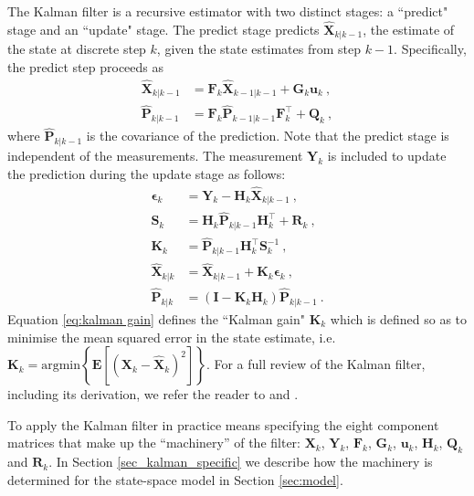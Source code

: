 \documentclass[fleqn,usenatbib,useAMS]{mnras}
\begin{document}
The Kalman filter is a recursive estimator with two distinct stages: a ``predict" stage and an ``update" stage. The predict stage predicts $\hat{\boldsymbol{X}}_{k|k-1}$, the estimate of the state at discrete step $k$, given the state estimates from step $k-1$. Specifically, the predict step proceeds as
\begin{align}
	\hat{\boldsymbol{X}}_{k|k-1} &=  \boldsymbol{F}_k \hat{\boldsymbol{X}}_{k-1|k-1} + \boldsymbol{G}_k \boldsymbol{u}_k \ , \\
		\hat{\boldsymbol{P}}_{k|k-1} &=  \boldsymbol{F}_k \hat{\boldsymbol{P}}_{k-1|k-1} \boldsymbol{F}_k^\intercal + \boldsymbol{Q}_k  \ ,
\end{align}
where $\hat{\boldsymbol{P}}_{k|k-1}$ is the covariance of the prediction. Note that the predict stage is independent of the measurements. The measurement $\boldsymbol{Y}_k$ is included to update the prediction during the update stage as follows:
\begin{align}
	\boldsymbol{\epsilon}_{k} &= \boldsymbol{Y}_k - \boldsymbol{H}_k \hat{\boldsymbol{X}}_{k|k-1} \ , \\
	\boldsymbol{S}_k &= \boldsymbol{H}_k \hat{\boldsymbol{P}}_{k|k-1} \boldsymbol{H}_k^\intercal + \boldsymbol{R}_k \ , \\
	\boldsymbol{K}_k &= \hat{\boldsymbol{P}}_{k|k-1} \boldsymbol{H}_k^\intercal \boldsymbol{S}_k^{-1} \ ,\label{eq:kalman gain} \\
		\hat{\boldsymbol{X}}_{k|k} &=\hat{\boldsymbol{X}}_{k|k-1} +\boldsymbol{K}_k  \boldsymbol{\epsilon}_{k}  \ , \label{eq:kalmangainupdate} \\
			\hat{\boldsymbol{P}}_{k|k} &= \left( \boldsymbol{I} - \boldsymbol{K}_k \boldsymbol{H}_k \right) 	\hat{\boldsymbol{P}}_{k|k-1} \ .
\end{align}
Equation \eqref{eq:kalman gain} defines the ``Kalman gain" $\boldsymbol{K}_k$ which is defined so as to minimise the mean squared error in the state estimate, i.e.  $\boldsymbol{K}_k = \text{argmin} \left \{ \boldsymbol{E}[ (\boldsymbol{X}_k - \hat{\boldsymbol{X}}_k)^2 ] \right \}$. For a full review of the Kalman filter, including its derivation, we refer the reader to \cite{Gelb:1974} and \cite{zarchan2000fundamentals}. \newline 

To apply the Kalman filter in practice means specifying the eight component matrices that make up the ``machinery'' of the filter: $\boldsymbol{X}_k$, $\boldsymbol{Y}_k$, $\boldsymbol{F}_k$, $\boldsymbol{G}_k$, $\boldsymbol{u}_k$, $\boldsymbol{H}_k$, $\boldsymbol{Q}_k$ and $\boldsymbol{R}_k$. In Section \ref{sec_kalman_specific} we describe how the machinery is determined for the state-space model in Section \ref{sec:model}. 
\end{document}
